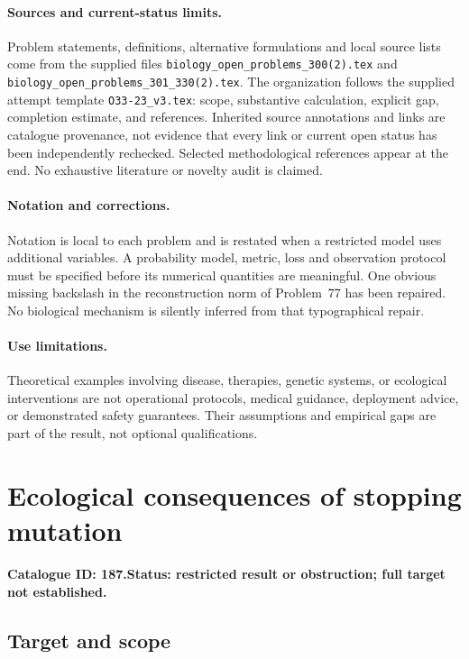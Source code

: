 \documentclass[11pt]{article}
\begin{document}
\paragraph{Sources and current-status limits.}
Problem statements, definitions, alternative formulations and local source lists
come from the supplied files
\texttt{biology\_open\_problems\_300(2).tex} and
\texttt{biology\_open\_problems\_301\_330(2).tex}.
The organization follows the supplied attempt template
\texttt{O33-23\_v3.tex}: scope, substantive calculation, explicit gap,
completion estimate, and references. Inherited source annotations and links are
catalogue provenance, not evidence that every link or current open status has
been independently rechecked. Selected methodological references appear at the
end. No exhaustive literature or novelty audit is claimed.

\paragraph{Notation and corrections.}
Notation is local to each problem and is restated when a restricted model uses
additional variables. A probability model, metric, loss and observation protocol
must be specified before its numerical quantities are meaningful. One obvious
missing backslash in the reconstruction norm of Problem~77 has been repaired.
No biological mechanism is silently inferred from that typographical repair.

\paragraph{Use limitations.}
Theoretical examples involving disease, therapies, genetic systems, or ecological
interventions are not operational protocols, medical guidance, deployment advice,
or demonstrated safety guarantees. Their assumptions and empirical gaps are part
of the result, not optional qualifications.

\setcounter{section}{186}
\section{Ecological consequences of stopping mutation}
\label{prob:187}
\noindent\textbf{Catalogue ID: 187.}\quad \textbf{Status: restricted result or obstruction; full target not established.}
\subsection{Target and scope}
\end{document}
